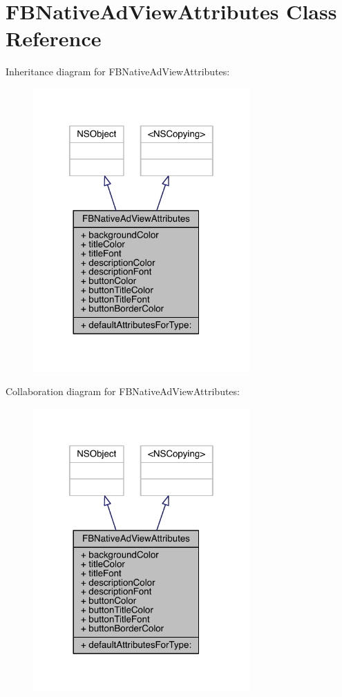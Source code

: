 \hypertarget{interface_f_b_native_ad_view_attributes}{\section{F\-B\-Native\-Ad\-View\-Attributes Class Reference}
\label{interface_f_b_native_ad_view_attributes}
}


Inheritance diagram for F\-B\-Native\-Ad\-View\-Attributes\-:
\nopagebreak
\begin{figure}[H]
\begin{center}
\leavevmode
\includegraphics[width=235pt]{interface_f_b_native_ad_view_attributes__inherit__graph}
\end{center}
\end{figure}


Collaboration diagram for F\-B\-Native\-Ad\-View\-Attributes\-:
\nopagebreak
\begin{figure}[H]
\begin{center}
\leavevmode
\includegraphics[width=235pt]{interface_f_b_native_ad_view_attributes__coll__graph}
\end{center}
\end{figure}
